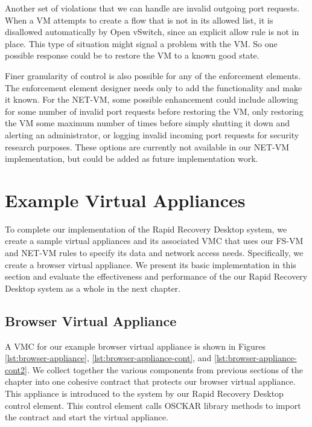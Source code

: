 Another set of violations that we can handle are invalid outgoing port requests. When a VM attempts to create a flow that is not in its allowed list, it is disallowed automatically by Open vSwitch, since an explicit allow rule is not in place. This type of situation might signal a problem with the VM. So one possible response could be to restore the VM to a known good state.

Finer granularity of control is also possible for any of the enforcement elements. The enforcement element designer needs only to add the functionality and make it known. For the NET-VM, some possible enhancement could include allowing for some number of invalid port requests before restoring the VM, only restoring the VM some maximum number of times before simply shutting it down and alerting an administrator, or logging invalid incoming port requests for security research purposes. These options are currently not available in our NET-VM implementation, but could be added as future implementation work.

\section{Example Virtual Appliances}
\label{sec:example-appliances-implementation}

To complete our implementation of the Rapid Recovery Desktop system, we create a sample virtual appliances and its associated VMC that uses our FS-VM and NET-VM rules to specify its data and network access needs. Specifically, we create a browser virtual appliance. We present its basic implementation in this section and evaluate the effectiveness and performance of the our Rapid Recovery Desktop system as a whole in the next chapter.

\subsection{Browser Virtual Appliance}

A VMC for our example browser virtual appliance is shown in Figures \ref{lst:browser-appliance}, \ref{lst:browser-appliance-cont}, and \ref{lst:browser-appliance-cont2}. We collect together the various components from previous sections of the chapter into one cohesive contract that protects our browser virtual appliance. This appliance is introduced to the system by our Rapid Recovery Desktop control element. This control element calls OSCKAR library methods to import the contract and start the virtual appliance. 

